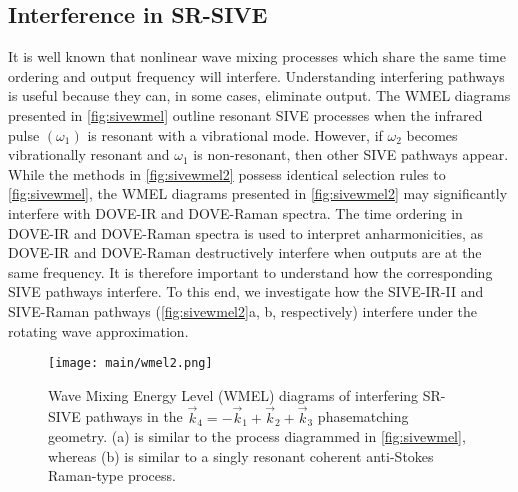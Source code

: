 \documentclass[aip, jcp, reprint, onecolumn]{revtex4-2}
\begin{document}
\subsection{Interference in SR-SIVE}
It is well known that nonlinear wave mixing processes which share the same time ordering and output frequency will interfere. \cite{RN135, Bonn2024}
Understanding interfering pathways is useful because they can, in some cases, eliminate output. \cite{RN342, RN135}
The WMEL diagrams presented in \autoref{fig:sivewmel} outline resonant SIVE processes when the infrared pulse $(\omega_1)$ is resonant with a vibrational mode. 
However, if $\omega_2$ becomes vibrationally resonant and $\omega_1$ is non-resonant, then other SIVE pathways appear.\cite{McDonnell2024} 
While the methods in \autoref{fig:sivewmel2} possess identical selection rules to \autoref{fig:sivewmel}, the WMEL diagrams presented in \autoref{fig:sivewmel2} may significantly interfere with DOVE-IR and DOVE-Raman spectra.
The time ordering in DOVE-IR and DOVE-Raman spectra is used to interpret anharmonicities, as DOVE-IR and DOVE-Raman destructively interfere when outputs are at the same frequency. \cite{RN135, RN324}
It is therefore important to understand how the corresponding SIVE pathways interfere.
To this end, we investigate how the SIVE-IR-II and SIVE-Raman pathways (\autoref{fig:sivewmel2}a, b, respectively) interfere under the rotating wave approximation. 

\begin{figure}[!htbp]
	\centering
	\texttt{[image: main/wmel2.png]}
	\caption{Wave Mixing Energy Level (WMEL) diagrams of interfering SR-SIVE pathways in the  $\vec{k}_4 = -\vec{k}_1 + \vec{k}_2 + \vec{k}_3$ phasematching geometry. 
	(a) is similar to the process diagrammed in \autoref{fig:sivewmel}, whereas (b) is similar to a singly resonant coherent anti-Stokes Raman-type process.}
	\label{fig:sivewmel2}
\end{figure}
\end{document}
